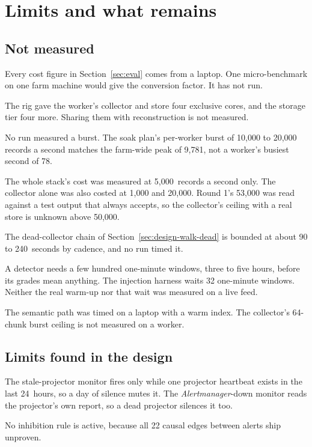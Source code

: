 \section{Limits and what remains}\label{sec:limits}

\subsection{Not measured}\label{sec:limits-unmeasured}

Every cost figure in Section~\ref{sec:eval} comes from a laptop. One micro-benchmark on one farm machine would give the conversion factor. It has not run.

The rig gave the worker's collector and store four exclusive cores, and the storage tier four more. Sharing them with reconstruction is not measured.

No run measured a burst. The soak plan's per-worker burst of 10,000 to 20,000 records a second matches the farm-wide peak of 9,781, not a worker's busiest second of 78.

The whole stack's cost was measured at 5,000~records a second only. The collector alone was also costed at 1,000 and 20,000. Round 1's 53,000 was read against a test output that always accepts, so the collector's ceiling with a real store is unknown above 50,000.

The dead-collector chain of Section~\ref{sec:design-walk-dead} is bounded at about 90 to 240~seconds by cadence, and no run timed it.

A detector needs a few hundred one-minute windows, three to five hours, before its grades mean anything. The injection harness waits 32 one-minute windows. Neither the real warm-up nor that wait was measured on a live feed.

The semantic path was timed on a laptop with a warm index. The collector's 64-chunk burst ceiling is not measured on a worker.

\subsection{Limits found in the design}\label{sec:limits-design}

The stale-projector monitor fires only while one projector heartbeat exists in the last 24~hours, so a day of silence mutes it. The \textit{Alertmanager}-down monitor reads the projector's own report, so a dead projector silences it too.

No inhibition rule is active, because all 22 causal edges between alerts ship unproven.

